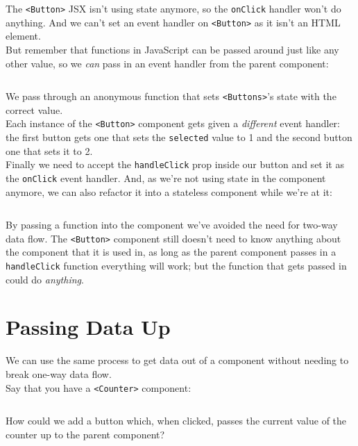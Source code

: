 The \texttt{<Button>} JSX isn't using state anymore, so the \texttt{onClick} handler won't do anything. And we can't set an event handler on \texttt{<Button>} as it isn't an HTML element.
\\

But remember that functions in JavaScript can be passed around just like any other value, so we \textit{can} pass in an event handler from the parent component:

\inputminted{jsx}{03/figures/02/05-Buttons-click.jsx}

We pass through an anonymous function that sets \texttt{<Buttons>}'s state with the correct value.
\\

Each instance of the \texttt{<Button>} component gets given a \textit{different} event handler: the first button gets one that sets the \texttt{selected} value to 1 and the second button one that sets it to 2.
\\

Finally we need to accept the \texttt{handleClick} prop inside our button and set it as the \texttt{onClick} event handler. And, as we're not using state in the component anymore, we can also refactor it into a stateless component while we're at it:

\inputminted{jsx}{03/figures/02/06-Button-func.jsx}

By passing a function into the component we've avoided the need for two-way data flow. The \texttt{<Button>} component still doesn't need to know anything about the component that it is used in, as long as the parent component passes in a \texttt{handleClick} function everything will work; but the function that gets passed in could do \textit{anything}.


\section{Passing Data Up}

We can use the same process to get data out of a component without needing to break one-way data flow.
\\

Say that you have a \texttt{<Counter>} component:

\inputminted{jsx}{03/figures/02/07-Counter.jsx}

How could we add a button which, when clicked, passes the current value of the counter up to the parent component?


\pagebreak


